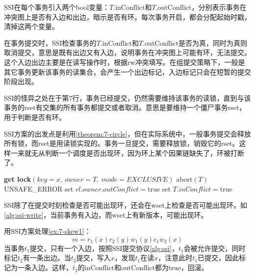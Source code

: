 SSI在每个事务引入两个bool变量：$T.\text{inConflict}$和$T.\text{outConflict}$，分别表示事务在冲突图上是否有入边和出边，暗示是否有环。每次事务开启，都会分配起始时戳，清掉这两个变量。

在事务提交时，SSI检查事务的$T.\text{inConflict}$和$T.\text{outConflict}$是否为真，同时为真则取消提交，意思是既有出边又有入边，说明事务在冲突图上可能有环，无法提交。这个入边出边主要是在读写操作时，根据rw冲突填写。在组提交策略下，一般是其它事务更新该事务的读集合，会产生一个出边标记，入边标记只会在短暂的提交阶段出现。

SSI的怪异之处在于第7行，事务已经提交，仍然需要维持该事务的读锁，直到与该事务的rset有交集的所有事务都提交或者取消。意思是要维持一个僵尸事务rset，用于判断是否有环。

SSI方案的出发点是利用\theoremname\ref{theorem:7-circle}，但在实际系统中，一般事务提交会释放所有锁，而rset是用读锁实现的。事务一旦提交，需要释放锁，销毁它的rset。这样一来就无从判断一个调度是否出现环，因为环上某个因果链缺失了，环被打断了。

\begin{algorithm}[H]\label{alg:ssi-write}
    \caption{SSI Write $\mathrm{write}(T, x, x\text{New})$}
    \begin{algorithmic}[1]
        \State \textbf{get lock}$(key = x,\ owner = T,\ mode = EXCLUSIVE)$
                    \State abort$(T)$
                    \State \Return UNSAFE\_ERROR
                \EndIf
                \State set $rl.owner.outConflict = \text{true}$
                \State set $T.inConflict = \text{true}$
            \EndIf
        \EndFor
        \Statex {}
    \end{algorithmic}
\end{algorithm}

SSI除了在提交时刻检查是否可能出现环，还会在wset上检查是否可能出现环。如\algorithmname\ref{alg:ssi-write}，当前事务有入边，而wset上有新版本，可能出现环。

\begin{example}
    用SSI方案处理\examplename\ref{ex:7-skew1}：
$$
m = r_1(x)r_2(y)w_1(y)c_1w_2(x)
$$
当事务$t_1$提交，只有一个入边，按照SSI提交协议\ref{alg:ssi}，$t_1$会被允许提交，同时标记$t_2$有一条出边。当$t_2$提交，写入$x$，发现$t_1$在读$x$，注意此时$t_1$已提交，因此标记为一条入边。这样，$t_2$的$\text{inConflict}$和$\text{outConflict}$都为true，回滚。
\end{example}

